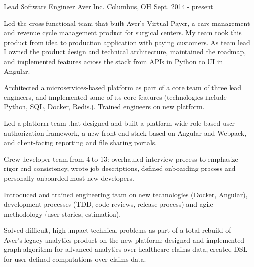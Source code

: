 

\begin{cventries}

  \cventry
    {Lead Software Engineer} %
    {Aver Inc.} %
    {Columbus, OH} %
    {Sept. 2014 - present} %
    {
      \begin{cvitems} %
        \item {Led the cross-functional team that built Aver's Virtual Payer, a care management and revenue cycle management product for surgical centers.
        My team took this product from idea to production application with paying customers.
        As team lead I owned the product design and technical architecture, maintained the roadmap, and implemented features across the stack from APIs in Python to UI in Angular.}
        \item {Architected a microservices-based platform as part of a core team of three lead engineers, and implemented some of its core features (technologies include Python, SQL, Docker, Redis.).
        Trained engineers on new platform.}
        \item {Led a platform team that designed and built a platform-wide role-based user authorization framework, a new front-end stack based on Angular and Webpack, and client-facing reporting and file sharing portals.}
        \item {Grew developer team from 4 to 13: overhauled interview process to emphasize rigor and consistency, wrote job descriptions, defined onboarding process and personally onboarded most new developers.}
        \item {Introduced and trained engineering team on new technologies (Docker, Angular), development processes (TDD, code reviews, release process) and agile methodology (user stories, estimation).}
        \item {Solved difficult, high-impact technical problems as part of a total rebuild of Aver's legacy analytics product on the new platform: designed and implemented graph algorithm for advanced analytics over healthcare claims data, created DSL for user-defined computations over claims data.}
      \end{cvitems}
    }


\end{cventries}

